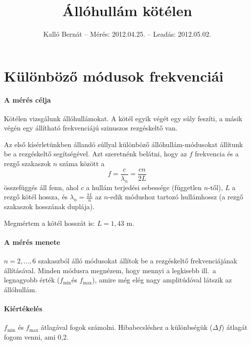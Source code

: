 \documentclass[12pt]{article}
\title{Állóhullám kötélen}
\author{Kalló Bernát -- Mérés: 2012.04.25. -- Leadás: 2012.05.02.}
\date{}
\begin{document}
\def\lambdan{\ensuremath{\lambda_n}}\def\fmin{\ensuremath{f_\min}}\def\fix{\ensuremath{f_i}}\def\fmax{\ensuremath{f_\max}}\def\Deltaf{\ensuremath{\Delta{}f}}
\maketitle

\section{Különböző módusok frekvenciái}

\paragraph{A mérés célja}

Kötélen vizsgálunk állóhullámokat. A kötél egyik végét egy súly feszíti, a másik végén egy állítható frekvenciájú szinuszos rezgéskeltő van.

Az első kísérletünkben állandó súllyal különböző állóhullám-módusokat állítunk be a rezgéskeltő segítségével. Azt szeretnénk belátni, hogy az $f$ frekvencia és a rezgő szakaszok $n$ száma között a \[f=\frac{c}{\lambdan}=\frac{cn}{2L}\] összefüggés áll fenn, ahol $c$ a hullám terjedési sebessége (független $n$-től), $L$ a rezgő kötél hossza, és $\lambdan=\frac{2L}{n}$ az $n$-edik módushoz tartozó hullámhossz (a rezgő szakaszok hosszának duplája).

Megmértem a kötél hosszát is: $L=1,43$ m.

\paragraph{A mérés menete}

$n=2,\dots,6$ szakaszból álló módusokat állítok be a rezgéskeltő frekvenciájának állításával. Minden módusra megnézem, hogy mennyi a legkisebb ill.\ a legnagyobb érték (\fmin és \fmax), amire még elég nagy amplitúdóval látszik az állóhullám.


\paragraph{Kiértékelés}

\fmin{} és \fmax{} átlagával fogok számolni. Hibabecsléshez a különbségük (\Deltaf) átlagát fogom venni, ami 0,2.
\end{document}
